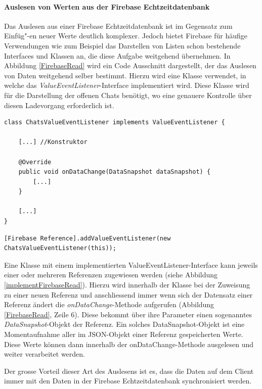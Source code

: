\documentclass[../main.tex]{subfiles}
\begin{document}
	\paragraph{Auslesen von Werten aus der Firebase Echtzeitdatenbank}
	Das Auslesen aus einer Firebase Echtzeitdatenbank ist im Gegensatz zum Einfüg"-en neuer Werte deutlich komplexer. Jedoch bietet Firebase für häufige Verwendungen wie zum Beispiel das Darstellen von Listen schon bestehende Interfaces und Klassen an, die diese Aufgabe weitgehend übernehmen. In Abbildung \ref{FirebaseRead} wird ein Code Ausschnitt dargestellt, der das Auslesen von Daten weitgehend selber bestimmt. Hierzu wird eine Klasse verwendet, in welche das \emph{ValueEventListener}-Interface implementiert wird. Diese Klasse wird für die Darstellung der offenen Chats benötigt, wo eine genauere Kontrolle über diesen Ladevorgang erforderlich ist.
	
\begin{code}
	\begin{center}
		\begin{verbatim}
class ChatsValueEventListener implements ValueEventListener {
	
	[...] //Konstruktor
	
	@Override
	public void onDataChange(DataSnapshot dataSnapshot) {
		[...]
	}

	[...]
}
		\end{verbatim}
		\caption{ValueEventListener-Klasse für das Auslesen von Daten aus der Firebase Echtzeitdatenbank (Quelle: Eigene Darstellung)}
		\label{FirebaseRead}
	\end{center}
\end{code}

\begin{code}
	\begin{center}
		\begin{verbatim}
[Firebase Reference].addValueEventListener(new ChatsValueEventListener(this));
		\end{verbatim}
		\caption{Zuweisung eines ValueEventListeners zu einer Referenz (Quelle: Eigene Darstellung)}
		\label{implementFirebaseRead}
	\end{center}
\end{code}
	
	Eine Klasse mit einem implementierten ValueEventListener-Interface \newline kann jeweils einer oder mehreren Referenzen zugewiesen werden (siehe Abbildung \ref{implementFirebaseRead}). Hierzu wird innerhalb der Klasse bei der Zuweisung zu einer neuen Referenz und anschliessend immer wenn sich der Datensatz einer Referenz ändert die \emph{onDataChange}-Methode aufgerufen (Abbildung \ref{FirebaseRead}, Zeile 6). Diese bekommt über ihre Parameter einen sogenanntes \emph{DataSnapshot}-Objekt der Referenz. Ein solches DataSnapshot-Objekt ist eine Momentaufnahme aller im JSON-Objekt einer Referenz gespeicherten Werte. Diese Werte können dann innerhalb der onDataChange-Methode ausgelesen und weiter verarbeitet werden.
	
	Der grosse Vorteil dieser Art des Auslesens ist es, dass die Daten auf dem Client immer mit den Daten in der Firebase Echtzeitdatenbank synchronisiert werden.
\end{document}
